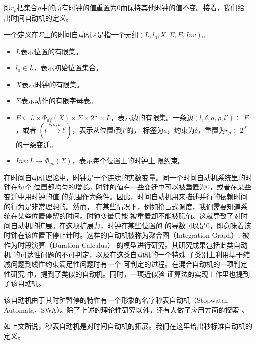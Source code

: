 即$r_\rho$把集合$\rho$中的所有时钟的值重置为0而保持其他时钟的值不变。接着，我们给
出时间自动机的定义。

\begin{definition}
	\label{def:TA}
	一个定义在$\varSigma$上的时间自动机$A$是指一个元组$(L,l_0,X,\varSigma,E,
	Inv)$。
	\begin{itemize}
		\item $L$表示位置的有限集。
		\item $l_0\in L$，表示初始位置集合。
		\item $X$表示时钟的有限集。
		\item $\varSigma$表示动作的有限字母表。
		\item $E\subseteq L\times \varPhi_{df}(X)\times \varSigma \times 2^X
		\times L$，表示边的有限集。一条边$(l,\delta,a,\rho,l')\subseteq E$，或者
		$(l\stackrel{\delta,a,\rho}{\longrightarrow}l')$，表示从位置$l$到$l'$的，
		标签为$a$，约束为$\delta$，重置为$r_\rho \in 2^X$的一条变迁。
		\item $Inv:L\longrightarrow \varPhi_{ub}(X)$，表示每个位置上的时钟上
		限约束。
	\end{itemize}
\end{definition}

在时间自动机理论中，时钟是一个连续的实数变量。同一个时间自动机系统里的时钟在每个
位置都均匀的增长。时钟的值在一些变迁中可以被重置为0，或者在某些变迁中用时钟的值
的范围作为条件。因此，时间自动机用来描述并行的依赖时间的行为是非常理想的。然而，
在某些情况下，例如抢占式调度，我们需要知道系统在某些位置停留的时间。时钟变量只能
被重置却不能被赋值。这就导致了对时间自动机的扩展。在这项扩展力，时钟在某些位置的
的导数可以是0，即意味着该时钟在该位置下停止计时。这样的自动机被称为聚合图（Integration
Graph）\cite{Kesten:1999:DIG:302392.302397}, 被作为时段演算（Duration Calculus）
\cite{DBLP:journals/ipl/ChaochenHR91}的模型进行研究。其研究成果包括此类自动机
的可达性问题的不可判定\cite{Alur04decisionproblems}，以及在这类自动机的一个特殊
子类别上利用基于缩减问题到线性约束满足性问题\cite{Apt:2003:PCP:1237975}时有一个
可判定的过程。在混合自动机\cite{Henzinger96thetheory}的一项判定性研究
\cite{McManis:1994:SAD:647763.735660}中，提到了类似的自动机。同时，一项近似验
证算法的实现工作\cite{Cassez:2000:IPS:646735.701625}里也提到了该自动机。

该自动机由于其时钟暂停的特性有一个形象的名字\pozhehao 秒表自动机（Stopwatch
Automata，SWA）。除了上述的理论性研究以外，还有人做了应用方面的探索
\cite{Abdeddaim:2002:PJS:646486.694487}。

如上文所说，秒表自动机是对时间自动机的拓展。我们在这里给出秒标准自动机的定义。

